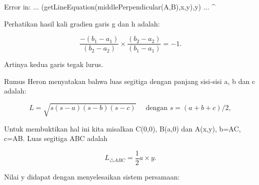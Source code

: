 \documentclass[a4paper,10pt]{article}
\begin{document}
\begin{eulernotebook}
\begin{eulercomment}
\begin{eulercomment}
\begin{eulercomment}
\begin{eulercomment}
\begin{eulercomment}
\begin{eulercomment}
\begin{eulercomment}
\begin{eulercomment}
\begin{eulercomment}
\begin{eulercomment}
\begin{eulercomment}
\begin{eulercomment}
\begin{eulercomment}
\begin{eulercomment}
\begin{eulercomment}
\begin{eulercomment}
\begin{euleroutput}
  Error in:
  ... (getLineEquation(middlePerpendicular(A,B),x,y),y) ...
                                                       ^
\end{euleroutput}
\begin{eulercomment}
Perhatikan hasil kali gradien garis g dan h adalah:

\end{eulercomment}
\begin{eulerformula}
\[
\frac{-(b_1-a_1)}{(b_2-a_2)}\times \frac{(b_2-a_2)}{(b_1-a_1)} = -1.
\]
\end{eulerformula}
\begin{eulercomment}
Artinya kedua garis tegak lurus.

\end{eulercomment}
\begin{eulercomment}
Rumus Heron menyatakan bahwa luas segitiga dengan panjang sisi-sisi a,
b dan c adalah:

\end{eulercomment}
\begin{eulerformula}
\[
L = \sqrt{s(s-a)(s-b)(s-c)}\quad \text{ dengan } s=(a+b+c)/2,
\]
\end{eulerformula}
\begin{eulercomment}
Untuk membuktikan hal ini kita misalkan C(0,0), B(a,0) dan A(x,y),
b=AC, c=AB. Luas segitiga ABC adalah

\end{eulercomment}
\begin{eulerformula}
\[
L_{\triangle ABC}=\frac{1}{2}a\times y.
\]
\end{eulerformula}
\begin{eulercomment}
Nilai y didapat dengan menyelesaikan sistem persamaan:


\end{eulercomment}
\end{eulercomment}
\end{eulercomment}
\end{eulercomment}
\end{eulercomment}
\end{eulercomment}
\end{eulercomment}
\end{eulercomment}
\end{eulercomment}
\end{eulercomment}
\end{eulercomment}
\end{eulercomment}
\end{eulercomment}
\end{eulercomment}
\end{eulercomment}
\end{eulercomment}
\end{eulercomment}
\end{eulernotebook}
\end{document}
